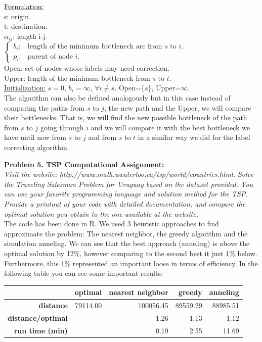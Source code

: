 \documentclass[11pt, english]{article}
\begin{document}
\underline{Formulation:}\\
s: origin.\\
t: destination.\\
$\alpha_{ij}$: length i-j.\\
$\left\{\begin{array}{ll}
b_i: & \text{length of the minimum bottleneck arc from }s\text{ to }i.\\
p_i: & \text{parent of node }i.
\end{array}\right.$\\
Open: set of nodes whose labels may need correction.\\
Upper: length of the minimum bottleneck from $s$ to $t$.\\ 

\underline{Initialization:}
$s=0$, $b_i=\infty$, $\forall i\neq s$. Open=$\{s\}$, Upper=$\infty$.\\

The algorithm can also be defined analogously but in this case instead of comparing the paths from $s$ to $j$, the new path and the Upper, we will compare their bottlenecks. That is, we will find the new possible bottleneck of the path from $s$ to $j$ going through $i$ and we will compare it with the best bottleneck we have until now from $s$ to $j$ and from $s$ to $t$ in a similar way we did for the label correcting algorithm. 




\textbf{Problem 5. TSP Computational Assignment:}\\\textit{ Visit the website: http://www.math.uwaterloo.ca/tsp/world/countries.html.
Solve the Traveling Salesman Problem for Uruguay based on the dataset provided. You can use your favorite programming language and solution method for the TSP. Provide a printout of your code with detailed documentation, and compare the optimal solution you obtain to the one available at the website.}\\

The code has been done in R. We used 3 heuristic approaches to find approximate the problem: The nearest neighbor, the greedy algorithm and the simulation anneling. We can see that the best approach (anneling) is above the optimal solution by 12\%, however comparing to the second best it just 1\% below. Furthermore, this 1\% represented an important loose in terms of efficiency. In the following table you can see some important results:

\begin{table}[ht]
	\centering
	\begin{tabular}{rrrrr}
		\hline
		& \textbf{optimal} & \textbf{nearest neighbor} & \textbf{greedy} & \textbf{anneling} \\ 
		\hline
		\textbf{distance} & 79114.00 & 100056.45 & 89559.29 & 88985.51 \\ 
		\textbf{distance/optimal} &  & 1.26 & 1.13 & 1.12 \\ 
		\textbf{run time (min)} &  & 0.19 & 2.55 & 11.69 \\ 
		\hline
	\end{tabular}
\end{table}

\lstset{style=myCustomMatlabStyle2}


\end{document}
